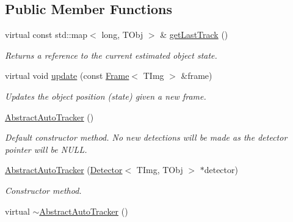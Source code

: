 \subsection*{Public Member Functions}
\begin{DoxyCompactItemize}
\item 
virtual const std\+::map$<$ long, T\+Obj $>$ \& \hyperlink{class_vision_core_1_1_abstractions_1_1_abstract_auto_tracker_afdfc24d8a5f14f873caf5e1d3ff55546}{get\+Last\+Track} ()
\begin{DoxyCompactList}\small\item\em Returns a reference to the current estimated object state. \end{DoxyCompactList}\item 
virtual void \hyperlink{class_vision_core_1_1_abstractions_1_1_abstract_auto_tracker_af1a54610c9af7fb54d00e4be2e75609e}{update} (const \hyperlink{struct_vision_core_1_1_data_structures_1_1_frame}{Frame}$<$ T\+Img $>$ \&frame)
\begin{DoxyCompactList}\small\item\em Updates the object position (state) given a new frame. \end{DoxyCompactList}\item 
\hypertarget{class_vision_core_1_1_abstractions_1_1_abstract_auto_tracker_a03660bad671c2ebfd95f6aa1ce28c052}{}\hyperlink{class_vision_core_1_1_abstractions_1_1_abstract_auto_tracker_a03660bad671c2ebfd95f6aa1ce28c052}{Abstract\+Auto\+Tracker} ()\label{class_vision_core_1_1_abstractions_1_1_abstract_auto_tracker_a03660bad671c2ebfd95f6aa1ce28c052}

\begin{DoxyCompactList}\small\item\em Default constructor method. No new detections will be made as the detector pointer will be N\+U\+L\+L. \end{DoxyCompactList}\item 
\hypertarget{class_vision_core_1_1_abstractions_1_1_abstract_auto_tracker_ac3066576292c60625eb465040200bb62}{}\hyperlink{class_vision_core_1_1_abstractions_1_1_abstract_auto_tracker_ac3066576292c60625eb465040200bb62}{Abstract\+Auto\+Tracker} (\hyperlink{class_vision_core_1_1_interfaces_1_1_detector}{Detector}$<$ T\+Img, T\+Obj $>$ $\ast$detector)\label{class_vision_core_1_1_abstractions_1_1_abstract_auto_tracker_ac3066576292c60625eb465040200bb62}

\begin{DoxyCompactList}\small\item\em Constructor method. \end{DoxyCompactList}\item 
\hypertarget{class_vision_core_1_1_abstractions_1_1_abstract_auto_tracker_afc00810bb20394cb52c201b9ac5215a2}{}virtual \hyperlink{class_vision_core_1_1_abstractions_1_1_abstract_auto_tracker_afc00810bb20394cb52c201b9ac5215a2}{$\sim$\+Abstract\+Auto\+Tracker} ()\label{class_vision_core_1_1_abstractions_1_1_abstract_auto_tracker_afc00810bb20394cb52c201b9ac5215a2}


\end{DoxyCompactItemize}
